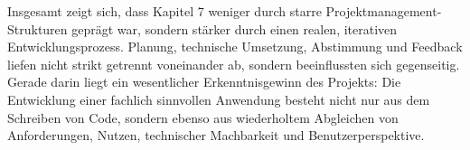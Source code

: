 Insgesamt zeigt sich, dass Kapitel 7 weniger durch starre Projektmanagement-Strukturen geprägt war, sondern stärker durch einen realen, iterativen Entwicklungsprozess. Planung, technische Umsetzung, Abstimmung und Feedback liefen nicht strikt getrennt voneinander ab, sondern beeinflussten sich gegenseitig. Gerade darin liegt ein wesentlicher Erkenntnisgewinn des Projekts: Die Entwicklung einer fachlich sinnvollen Anwendung besteht nicht nur aus dem Schreiben von Code, sondern ebenso aus wiederholtem Abgleichen von Anforderungen, Nutzen, technischer Machbarkeit und Benutzerperspektive.
